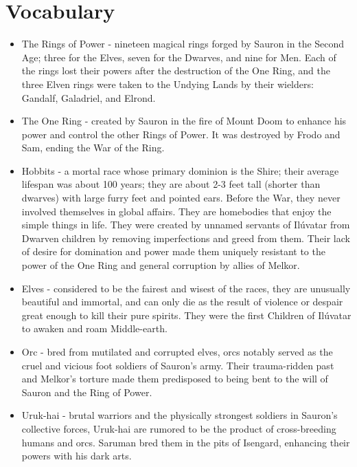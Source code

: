\documentclass[10pt, letterpaper]{article}
\begin{document}
\newpage

\section{Vocabulary}

\begin{itemize}
    \item {The Rings of Power - nineteen magical rings forged by Sauron in the Second Age; three for the Elves, seven for the Dwarves, and nine for Men. Each of the rings lost their powers after the destruction of the One Ring, and the three Elven rings were taken to the Undying Lands by their wielders: Gandalf, Galadriel, and Elrond.}
    
    \item {The One Ring - created by Sauron in the fire of Mount Doom to enhance his power and control the other Rings of Power. It was destroyed by Frodo and Sam, ending the War of the Ring.}
    
    \item {Hobbits  - a mortal race whose primary dominion is the Shire; their average lifespan was about 100 years; they are about 2-3 feet tall (shorter than dwarves) with large furry feet and pointed ears. Before the War, they never involved themselves in global affairs. They are homebodies that enjoy the simple things in life. They were created by unnamed servants of Ilúvatar from Dwarven children by removing imperfections and greed from them. Their lack of desire for domination and power made them uniquely resistant to the power of the One Ring and general corruption by allies of Melkor.}
    
    \item {Elves - considered to be the fairest and wisest of the races, they are unusually beautiful and immortal, and can only die as the result of violence or despair great enough to kill their pure spirits. They were the first Children of  Ilúvatar to awaken and roam Middle-earth. }
    
    \item {Orc - bred from mutilated and corrupted elves, orcs notably served as the cruel and vicious foot soldiers of Sauron’s army. Their trauma-ridden past and Melkor’s torture made them predisposed to being bent to the will of Sauron and the Ring of Power.}
    
    \item {Uruk-hai - brutal warriors and the physically strongest soldiers in Sauron’s collective forces, Uruk-hai are rumored to be the product of cross-breeding humans and orcs. Saruman bred them in the pits of Isengard, enhancing their powers with his dark arts.}
    

\end{itemize}
\end{document}

